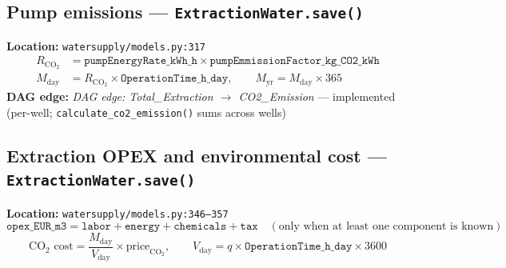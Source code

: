 \documentclass[11pt]{article}
\newcommand{\code}[1]{\texttt{#1}}
\newcommand{\dagedge}[1]{\textit{DAG edge: #1}}
\newcommand{\statusdone}{\textcolor{green!50!black}{implemented}}
\begin{document}
\subsection{Pump emissions --- \code{ExtractionWater.save()}}
\textbf{Location:} \code{watersupply/models.py:317}
\begin{align}
  R_{\text{CO}_2} &= \texttt{pumpEnergyRate\_kWh\_h} \times \texttt{pumpEmmissionFactor\_kg\_CO2\_kWh} \\
  M_{\text{day}} &= R_{\text{CO}_2} \times \texttt{OperationTime\_h\_day}, \qquad M_{\text{yr}} = M_{\text{day}} \times 365
\end{align}
\textbf{DAG edge:} \dagedge{Total\_Extraction $\rightarrow$ CO2\_Emission} --- \statusdone{} (per-well; \code{calculate\_co2\_emission()} sums across wells)

\subsection{Extraction OPEX and environmental cost --- \code{ExtractionWater.save()}}
\textbf{Location:} \code{watersupply/models.py:346--357}
\begin{equation}
  \texttt{opex\_EUR\_m3} = \texttt{labor} + \texttt{energy} + \texttt{chemicals} + \texttt{tax} \quad (\text{only when at least one component is known})
\end{equation}
\begin{equation}
  \text{CO}_2\text{ cost} = \frac{M_{\text{day}}}{V_{\text{day}}} \times \text{price}_{\text{CO}_2}, \qquad V_{\text{day}} = q \times \texttt{OperationTime\_h\_day} \times 3600
\end{equation}
\end{document}
